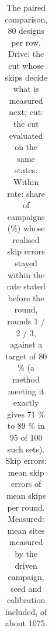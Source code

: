 \documentclass{iopjournal}
\begin{document}
{\renewcommand{\thetable}{S7.4}\small
\begin{longtable}[]{@{}
  >{\raggedright\arraybackslash}p{}
  >{\raggedright\arraybackslash}p{}
  >{\raggedright\arraybackslash}p{}
  >{\raggedright\arraybackslash}p{}
  >{\raggedright\arraybackslash}p{}
  >{\raggedright\arraybackslash}p{}@{}}
\caption{The paired comparison, 80 designs per row. Drive: the cut whose skips decide what is measured next; cut: the cut evaluated on the same states. Within rate: share of campaigns (\%) whose realised skip errors stayed within the rate stated before the round, rounds 1 / 2 / 3, against a target of 80 \% (a method meeting it exactly gives 71 \% to 89 \% in 95 of 100 such sets). Skip errors: mean skip errors of mean skips per round. Measured: mean sites measured by the driven campaign, seed and calibration included, of about 1075.}\label{tab:S7.4}\\


\end{longtable}}
\end{document}
